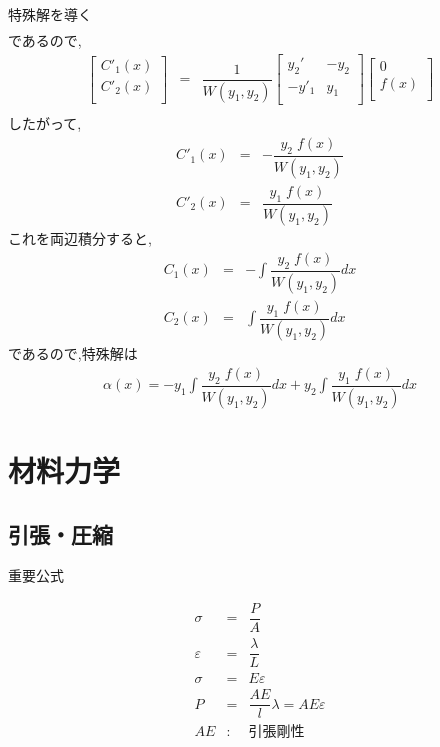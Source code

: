 \documentclass[a4paper]{jsarticle}
\begin{document}
\begin{itembox}[l]{特殊解を導く}
\begin{eqnarray*}
    \end{eqnarray*}
    であるので,
    \begin{eqnarray*}
        \begin{bmatrix}
            C'_1\left(x\right) \\
            C'_2\left(x\right) \\
        \end{bmatrix}
        &=&
        \dfrac{1}{W\left(y_1,y_2\right)}
        \begin{bmatrix}
            y_2'  & -y_2 \\
            -y'_1 & y_1  \\
        \end{bmatrix}
        \begin{bmatrix}
            0               \\
            f\left(x\right) \\
        \end{bmatrix}\\
    \end{eqnarray*}
    したがって,
    \begin{eqnarray*}
        C'_1\left(x\right)&=&-\dfrac{y_2\;f\left(x\right)}{W\left(y_1,y_2\right)}\\
        C'_2\left(x\right)&=&\dfrac{y_1\;f\left(x\right)}{W\left(y_1,y_2\right)}
    \end{eqnarray*}
    これを両辺積分すると,
    \begin{eqnarray*}
        \displaystyle
        C_1\left(x\right)&=&-\int\dfrac{y_2\;f\left(x\right)}{W\left(y_1,y_2\right)}dx\\
        C_2\left(x\right)&=&\int\dfrac{y_1\;f\left(x\right)}{W\left(y_1,y_2\right)}dx
    \end{eqnarray*}
    であるので,特殊解は
    \begin{eqnarray*}
        \alpha\left(x\right)=-y_1\int\dfrac{y_2\;f\left(x\right)}{W\left(y_1,y_2\right)}dx+y_2\int\dfrac{y_1\;f\left(x\right)}{W\left(y_1,y_2\right)}dx
    \end{eqnarray*}
\end{itembox}
\newpage
\section{材料力学}
\subsection{引張・圧縮}
\begin{itembox}[l]{重要公式}
    \begin{center}
        \begin{eqnarray*}
            \sigma&=&\dfrac{P}{A}\\
            \varepsilon&=&\dfrac{\lambda}{L}\\
            \sigma&=&E\varepsilon\\
            P&=&\dfrac{AE}{l}\lambda=AE\varepsilon\\
            AE&:&引張剛性\\
        \end{eqnarray*}
    \end{center}
\end{itembox}
\end{document}
